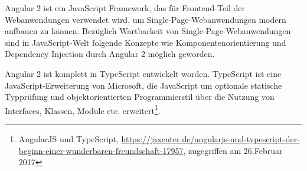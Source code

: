Angular 2 ist ein JavaScript Framework, das für Frontend-Teil der Webanwendungen verwendet wird, um Single-Page-Webanwendungen modern aufbauen zu können. Bezüglich Wartbarkeit von Single-Page-Webanwendungen sind in JavaScript-Welt folgende Konzepte wie Komponentenorientierung und Dependency Injection durch Angular 2 möglich geworden.

Angular 2 ist komplett in TypeScript entwickelt worden. TypeScript ist eine JavaScript-Erweiterung von Microsoft, die JavaScript um optionale statische Typprüfung und objektorientierten Programmierstil über die Nutzung von Interfaces, Klassen, Module etc. erweitert\footnote{AngularJS und TypeScript, \url{https://jaxenter.de/angularjs-und-typescript-der-beginn-einer-wunderbaren-freundschaft-17957}, zugegriffen am 26.Februar 2017}.


